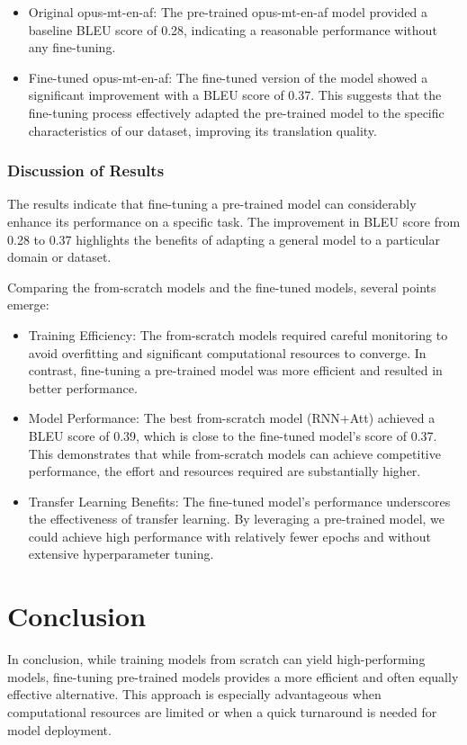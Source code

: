 \begin{itemize}
	\item Original opus-mt-en-af: The pre-trained opus-mt-en-af model provided a baseline BLEU score of 0.28, indicating a reasonable performance without any fine-tuning.
	\item Fine-tuned opus-mt-en-af: The fine-tuned version of the model showed a significant improvement with a BLEU score of 0.37. This suggests that the fine-tuning process effectively adapted the pre-trained model to the specific characteristics of our dataset, improving its translation quality.
\end{itemize}

\subsubsection{Discussion of Results}
The results indicate that fine-tuning a pre-trained model can considerably enhance its performance on a specific task. The improvement in BLEU score from 0.28 to 0.37 highlights the benefits of adapting a general model to a particular domain or dataset.

Comparing the from-scratch models and the fine-tuned models, several points emerge:
\begin{itemize}
	\item Training Efficiency: The from-scratch models required careful monitoring to avoid overfitting and significant computational resources to converge. In contrast, fine-tuning a pre-trained model was more efficient and resulted in better performance.
	\item Model Performance: The best from-scratch model (RNN+Att) achieved a BLEU score of 0.39, which is close to the fine-tuned model's score of 0.37. This demonstrates that while from-scratch models can achieve competitive performance, the effort and resources required are substantially higher.
	\item Transfer Learning Benefits: The fine-tuned model's performance underscores the effectiveness of transfer learning. By leveraging a pre-trained model, we could achieve high performance with relatively fewer epochs and without extensive hyperparameter tuning.
\end{itemize}
\section{Conclusion}
In conclusion, while training models from scratch can yield high-performing models, fine-tuning pre-trained models provides a more efficient and often equally effective alternative. This approach is especially advantageous when computational resources are limited or when a quick turnaround is needed for model deployment.


